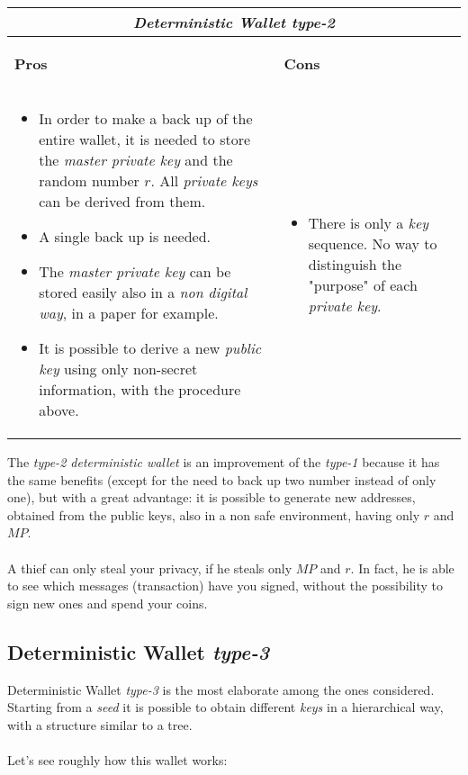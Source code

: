 \begin{center}
	\begin{tabular}{ |p{6cm}|p{6cm}|  }
		\hline
		\multicolumn{2}{|c|}{\textbf{\textit{Deterministic Wallet type-2}}} \\
		\hline \hline 
		\begin{center}
			\textbf{Pros}
		\end{center}&\begin{center}
			\textbf{Cons}
		\end{center}\\
		\hline
		\begin{itemize}
			\item In order to make a back up of the entire wallet, it is needed to store the \textit{master private key} and the random number $r$. All \textit{private keys} can be derived from them.
			\item A single back up is needed.
			\item The \textit{master private key} can be stored easily also in a \textit{non digital way}, in a paper for example.
			\item It is possible to derive a new \textit{public key} using only non-secret information, with the procedure above.
		\end{itemize} &
		\begin{itemize}
			\item There is only a \textit{key} sequence. No way to distinguish the "purpose" of each \textit{private key}.
		\end{itemize}\\
		\hline
	\end{tabular}
\end{center}
The \textit{type-2 deterministic wallet} is an improvement of the \textit{type-1} because it has the same benefits (except for the need to back up two number instead of only one), but with a great advantage: it is possible to generate new addresses, obtained from the public keys, also in a non safe environment, having only $r$ and $MP$. 
\\ \\
A thief can only steal your privacy, if he steals only $MP$ and $r$. In fact, he is able to see which messages (transaction) have you signed, without the possibility to sign new ones and spend your coins.

\subsection{Deterministic Wallet \textit{type-3}}
Deterministic Wallet \textit{type-3} is the most elaborate among the ones considered. Starting from a \textit{seed} it is possible to obtain different \textit{keys} in a hierarchical way, with a structure similar to a tree. 
\\ \\
Let's see roughly how this wallet works:

